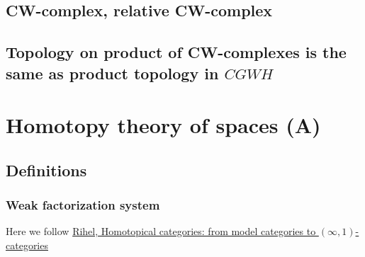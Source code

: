 \subsection*{CW-complex, relative CW-complex}
\subsection*{Topology on product of CW-complexes is the same as product topology in $CGWH$}

\section*{Homotopy theory  of spaces (A)}
\subsection*{Definitions}
\subsubsection{Weak factorization system}

Here we follow \href{https://arxiv.org/pdf/1904.0088}{Rihel, Homotopical categories: from model categories to $(\infty,1)$-categories}

